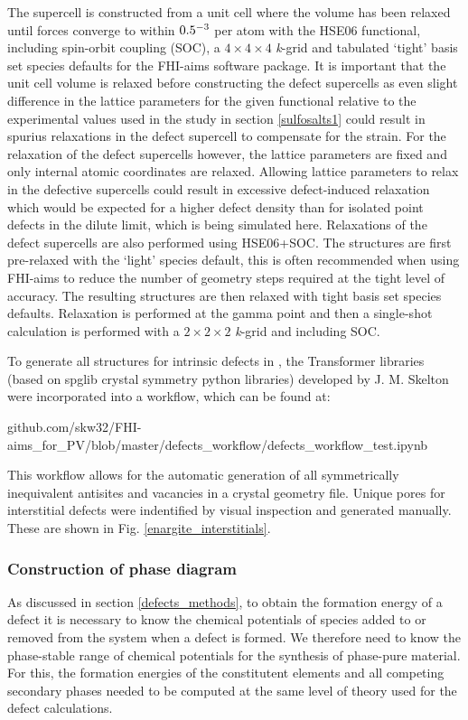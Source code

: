 \documentclass[11pt, twoside]{report}
\begin{document}
The supercell is constructed from a unit cell where the volume has been relaxed until forces converge to within $0.5\time10^{-3}$ per atom with the HSE06 functional, including spin-orbit coupling (SOC), a $4\times4\times4$ \textit{k}-grid and tabulated `tight' basis set species defaults for the FHI-aims software package. It is important that the unit cell volume is relaxed before constructing the defect supercells as even slight difference in the lattice parameters for the given functional relative to the experimental values used in the study in section \ref{sulfosalts1} could result in spurius relaxations in the defect supercell to compensate for the strain.
For the relaxation of the defect supercells however, the lattice parameters are fixed and only internal atomic coordinates are relaxed. Allowing lattice parameters to relax in the defective supercells could result in excessive defect-induced relaxation which would be expected for a higher defect density than for isolated point defects in the dilute limit, which is being simulated here. Relaxations of the defect supercells are also performed using HSE06+SOC. The structures are first pre-relaxed with the `light' species default, this is often recommended when using FHI-aims to reduce the number of geometry steps required at the tight level of accuracy. The resulting structures are then relaxed with tight basis set species defaults. Relaxation is performed at the gamma point and then a single-shot calculation is performed with a $2\times2\times2$ \textit{k}-grid and including SOC.

To generate all structures for intrinsic defects in {\enargite}, the Transformer libraries \cite{Transformer} (based on spglib crystal symmetry python libraries) developed by J. M. Skelton were incorporated into a workflow, which can be found at:

github.com/skw32/FHI-aims\_for\_PV/blob/master/defects\_workflow/defects\_workflow\_test.ipynb

This workflow allows for the automatic generation of all symmetrically inequivalent antisites and vacancies in a crystal geometry file. Unique pores for interstitial defects were indentified by visual inspection and generated manually. These are shown in Fig. \ref{enargite_interstitials}.



\subsubsection{Construction of phase diagram}
As discussed in section \ref{defects_methods}, to obtain the formation energy of a defect it is necessary to know the chemical potentials of species added to or removed from the system when a defect is formed. We therefore need to know the phase-stable range of chemical potentials for the synthesis of phase-pure material. For this, the formation energies of the constitutent elements and all competing secondary phases needed to be computed at the same level of theory used for the defect calculations.
\end{document}
